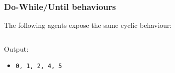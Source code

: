 \documentclass[presentation]{beamer}\mode<presentation>{\usetheme{AMSCesenaPurpleAndGold}}
\begin{document}
\begin{frame}%
    \frametitle{Do-While/Until behaviours}

    The following agents expose the same cyclic behaviour:

    \vfill

    \begin{columns}
        \begin{column}{.48\linewidth}
            
        \end{column}
        \begin{column}{.48\linewidth}
            
        \end{column}
    \end{columns}

    \vfill

    Output:
    \begin{itemize}
        \item \texttt{0, 1, 2, 4, 5}
    \end{itemize}

\end{frame}

%
%
%
%    
%
%
%
%
%
%            
%            
%
%
%
\end{document}
